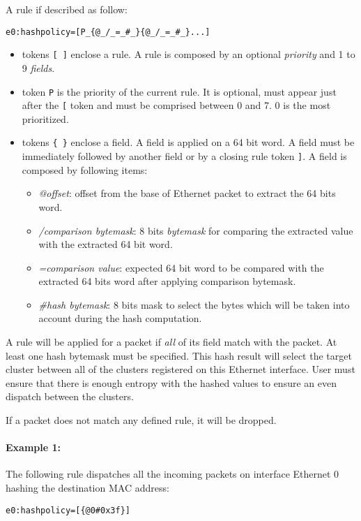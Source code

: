 \documentclass{trkalray}
\begin{document}
A rule if described as follow:
\begin{lstlisting}
e0:hashpolicy=[P_{@_/_=_#_}{@_/_=_#_}...]
\end{lstlisting}
\begin{itemize}
	\item tokens \texttt{[ ]} enclose a rule. A rule is composed by an
		optional \emph{priority} and 1 to 9 \emph{fields}.
	\item token \texttt{P} is the priority of the current rule. It is
		optional, must appear just after the \texttt{[} token and must
		be comprised between 0 and 7. 0 is the most prioritized.
	\item tokens \texttt{\{ \}} enclose a field. A field is
		applied on a 64 bit word. A field must be immediately
		followed by another field or by a closing rule token
		\texttt{]}. A field is composed by following items:
		\begin{itemize}
			\item \emph{@offset}: offset from the base of Ethernet packet
				to extract the 64 bits word.
			\item \emph{/comparison bytemask}: 8 bits \emph{bytemask} for
				comparing the extracted value with the extracted 64 bit
				word.
			\item \emph{=comparison value}: expected 64 bit word to be
				compared with the extracted 64 bits word after applying
				comparison bytemask.
			\item \emph{\#hash bytemask}: 8 bits mask to select the bytes
				which will be taken into account during the hash
				computation.
		\end{itemize}
\end{itemize}

A rule will be applied for a packet if \emph{all} of its field match
with the packet. At least one hash bytemask must be specified. This hash
result will select the target cluster between all of the clusters
registered on this Ethernet interface. User must ensure that there is
enough entropy with the hashed values to ensure an even dispatch between
the clusters.

If a packet does not match any defined rule, it will be dropped.

\paragraph{Example 1:}

The following rule dispatches all the incoming packets on interface Ethernet 0
hashing the destination MAC address:
\begin{lstlisting}
e0:hashpolicy=[{@0#0x3f}]
\end{lstlisting}
\end{document}
